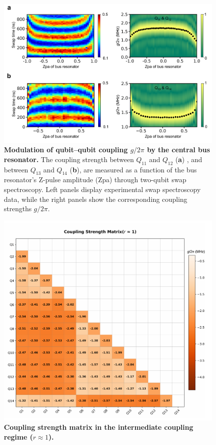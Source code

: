 \documentclass[reprint,superscriptaddress,preprintnumbers,longbibliography,
amsmath,amssymb,aps,floatfix,pra,twocolumn, tightenlines %
]{revtex4-2}
\begin{document}
	\begin{figure}
		\centering
		\includegraphics[width=1.0\linewidth]{suppFig/FigureSI_geff_bus_coupler.pdf}
		\caption{\textbf{Modulation of qubit–qubit coupling \(g/2\pi\) by the central bus resonator.} The coupling strength between \( Q_{11} \) and \( Q_{12} \) (\textbf{a}) , and between \( Q_{13} \) and \( Q_{14} \) (\textbf{b}), are measured as a function of the bus resonator’s Z-pulse amplitude (Zpa) through two-qubit swap spectroscopy. Left panels display experimental swap spectroscopy data, while the right panels show the corresponding coupling strengths \(g/2\pi\).}
		\label{geff_bus_coupler}
	\end{figure}

	\begin{figure}
		\centering
		\includegraphics[width=1.0\linewidth]{suppFig/FigureSI_g_r1.pdf}
		\caption{\textbf{Coupling strength matrix in the intermediate coupling regime ($r\approx1$).} }
		\label{r1}
	\end{figure}
\end{document}
